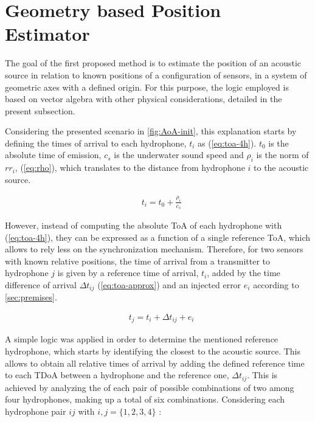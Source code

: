 
\section{Geometry based Position Estimator} \label{subsec:estimator}

The goal of the first proposed method is to estimate the position of an acoustic source in relation to known positions of a configuration of sensors, in a system of geometric axes with a defined origin. For this purpose, the logic employed is based on vector algebra with other physical considerations, detailed in the present subsection. 

Considering the presented scenario in \ref{fig:AoA-init}, this explanation starts by defining the times of arrival to each hydrophone, $t_i$ as (\ref{eq:toa-4h}). $t_0$ is the absolute time of emission, $c_s$ is the underwater sound speed and $\rho_i$ is the norm of $rr_i$, (\ref{eq:rho}), which translates to the distance from hydrophone $i$ to the acoustic source.

\begin{eqnarray}
	& t_i = t_0 +  \frac{\rho_i}{c_s}
	\label{eq:toa-4h}
\end{eqnarray}

However, instead of computing the absolute ToA of each hydrophone with (\ref{eq:toa-4h}), they can be expressed as a function of a single reference ToA, which allows to rely less on the synchronization mechanism. Therefore, for two sensors with known relative positions, the time of arrival from a transmitter to hydrophone $j$ is given by a reference time of arrival, $t_{i}$, added by the time difference of arrival $\Delta t_{ij}$ (\ref{eq:toa-approx}) and an injected error $e_i$ according to \ref{sec:premises}. 

\begin{eqnarray}
& t_j = t_{i} + \Delta t_{ij} + e_i
\label{eq:toa-approx}
\end{eqnarray}

A simple logic was applied in order to determine the mentioned reference hydrophone, which starts by identifying the closest to the acoustic source. This allows to obtain all relative times of arrival by adding the defined reference time to each TDoA between a hydrophone and the reference one, $ \Delta t_{ij}$. This is achieved by analyzing the of each pair of possible combinations of two among four hydrophones, making up a total of six combinations. Considering each hydrophone pair $ij$ with $i, j= \{1,2,3,4\}$ :

